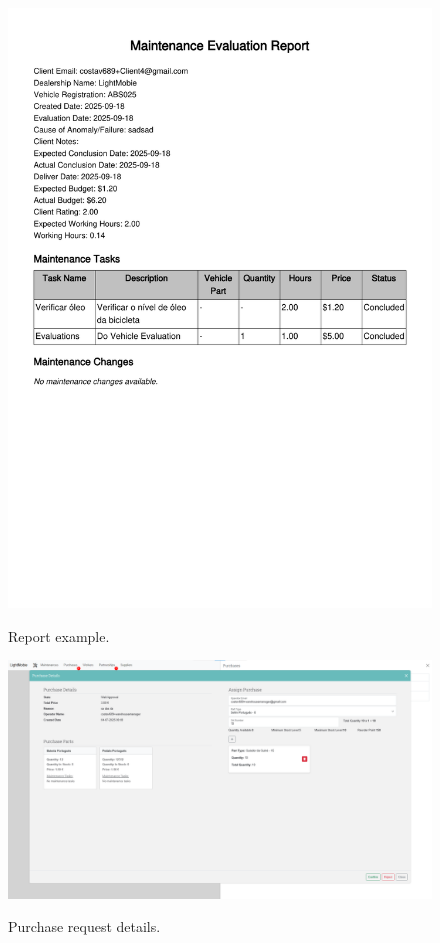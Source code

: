 \begin{figure}[htbp]
  \caption{Report example.}
  \centering
  \includegraphics[width=\textwidth]{figs/Implementation/workshopmanager/report}
  \label{fig:report}
\end{figure}


 


\begin{figure}[htbp]
  \caption{Purchase request details.}
  \centering
  \includegraphics[width=\textwidth]{figs/Implementation/workshopmanager/purchaseDetails}
  \label{fig:workshopmanagerPurchaseDetails}
\end{figure}


